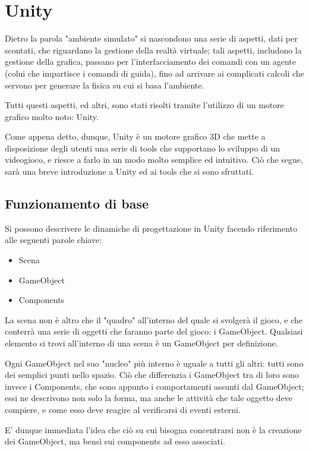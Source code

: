 \documentclass[a4paper,11pt,twoside]{report} %
\begin{document}
\section{Unity}

Dietro la parola "ambiente simulato" si nascondono una serie di aspetti, dati per scontati, che riguardano la gestione della realtà virtuale; tali aspetti, includono la gestione della grafica, passano per l'interfacciamento dei comandi con un agente (colui che impartisce i comandi di guida), fino ad arrivare ai complicati calcoli che servono per generare la fisica su cui si basa l'ambiente. 

Tutti questi aspetti, ed altri, sono stati risolti tramite l'utilizzo di un motore grafico molto noto: Unity.

Come appena detto, dunque, Unity è un motore grafico 3D che mette a disposizione degli utenti una serie di tools che supportano lo sviluppo di un videogioco, e riesce a farlo in un modo molto semplice ed intuitivo. Ciò che segue, sarà una breve introduzione a Unity ed ai tools che si sono sfruttati.

\subsection{Funzionamento di base}

Si possono descrivere le dinamiche di progettazione in Unity facendo riferimento alle seguenti parole chiave:

\begin{itemize}
	\item Scena
	\item GameObject
	\item Components
\end{itemize}

La scena non è altro che il "quadro" all'interno del quale si svolgerà il gioco, e che conterrà una serie di oggetti che faranno parte del gioco: i GameObject. Qualsiasi elemento si trovi all'interno di una scena è un GameObject per definizione. 

Ogni GameObject nel suo "nucleo" più interno è uguale a tutti gli altri: tutti sono dei semplici punti nello spazio. Ciò che differenzia i GameObject tra di loro sono invece i Components, che sono appunto i comportamenti assunti dal GameObject; essi ne descrivono non solo la forma, ma anche le attività che tale oggetto deve compiere, e come esso deve reagire al verificarsi di eventi esterni.

E' dunque immediata l'idea che ciò su cui bisogna concentrarsi non è la creazione dei GameObject, ma bensì sui components ad esso associati.
\end{document}
